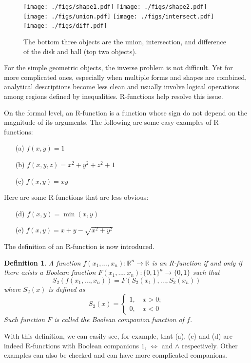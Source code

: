 \documentclass[11pt,reqno]{amsart}
\newtheorem{definition}{Definition}%
\theoremstyle{definition}
\begin{document}
\begin{figure}
\texttt{[image: ./figs/shape1.pdf]}
\texttt{[image: ./figs/shape2.pdf]}
\\
\texttt{[image: ./figs/union.pdf]}
\texttt{[image: ./figs/intersect.pdf]}
\texttt{[image: ./figs/diff.pdf]}
\caption{The bottom three objects are the union, intersection, and difference of the disk and ball (top two objects).}
\label{DiskAndBall}
\end{figure}

For the simple geometric objects, the inverse problem is not
difficult. Yet for more complicated ones, especially when multiple forms
and shapes are combined, analytical descriptions become less clean and usually involve logical operations among regions defined by inequalities. 
R-functions help resolve this issue.    

On the formal level, an R-function is a function whose sign do not depend on the magnitude of its arguments.  The following are some easy  examples of R-functions: 
\begin{enumerate}
\item[(a)] $f(x,y) = 1$
\item[(b)] $f(x,y,z) = x^2+y^2+z^2+1$
\item[(c)] $f(x,y) = xy$
\end{enumerate}
Here are some R-functions that are less obvious:
\begin{enumerate}
\item[(d)] $f(x,y) = \min(x,y)$
\item[(e)] $f(x,y) = x+y-\sqrt{x^2+y^2}$
\end{enumerate}
The definition of an R-function is now introduced.
\begin{definition}
A function $f(x_1,...,x_n):\mathbb{R}^n\to\mathbb{R}$ is an R-function if and only if there exists a Boolean function $F(x_1,...,x_n):\{0,1\}^n\to \{0,1\}$ such that
$$S_2(f(x_1,...,x_n))=F(S_2(x_1),...,S_2(x_n))$$
where $S_2(x)$ is defined as
$$S_2(x)=\begin{cases} 1,\quad x>0;\\ 0, \quad x<0\end{cases}$$
Such function $F$ is called the Boolean companion function of $f$.
\end{definition}

With this definition, we can easily see, for example, that (a), (c) and (d) are indeed R-functions with Boolean companions $1$, $\Leftrightarrow$ and $\wedge$
respectively. Other examples can also be checked and can have more complicated
companions. 
\end{document}
